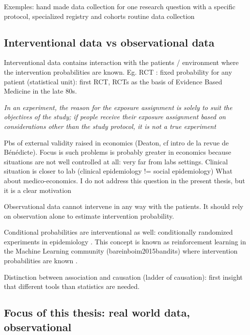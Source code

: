 \documentclass{report}
\begin{document}
Exemples:
hand made data collection for one research question with a specific protocol,
specialized registry and cohorts
routine data collection

\subsection{Interventional data vs observational
  data}\label{subsec:intro:interventional_vs_observational}


Interventional data contains interaction with the patients / environment where
the intervention probabilities are known. Eg. RCT : fixed probability for any
patient (statistical unit): first RCT, RCTs as the basis of Evidence Based
Medicine in the late 80s.

\textit{In an experiment, the reason for the exposure assignment is solely to
  suit the objectives of the study; if people receive their exposure assignment
  based on considerations other than the study protocol, it is not a true
  experiment} \citep{rothman2012epidemiology}

Pbs of external validity raised in economics (Deaton,
cf intro de la revue de Bénédicte). Focus is such problems is probably greater
in economics because situations are not well controlled at all: very far from
labs settings. Clinical situation is closer to lab (clinical epidemiology !=
social epidemiology) What about medico-economics. I do not address this question
in the present thesis, but it is a clear motivation

%
Observational data cannot intervene in any way with the patients. It should rely
on observation alone to estimate intervention probability.

Conditional probabilities are interventional as well: conditionally randomized
experiments in epidemiology \citep{hernan2020causal}. This concept is known as
reinforcement learning in the Machine Learning community (bareinboim2015bandits)
where intervention probabilities are known
\cite{bareinboim2015bandits}.

Distinction between association and causation (ladder of causation): first
insight that different tools than statistics are needed.

\subsection{Focus of this thesis: real world data, observational}\label{subsec:intro:focus_data}
\end{document}

